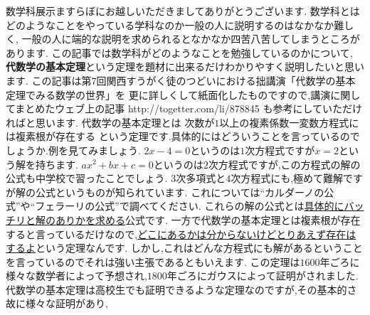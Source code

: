 


数学科展示ますらぼにお越しいただきましてありがとうございます.
数学科とはどのようなことをやっている学科なのか一般の人に説明するのはなかなか難しく,
一般の人に端的な説明を求められるとなかなか四苦八苦してしまうところがあります.
この記事では数学科がどのようなことを勉強しているのかについて,
\textbf{代数学の基本定理}という定理を題材に出来るだけわかりやすく説明したいと思います.
この記事は第7回関西すうがく徒のつどいにおける拙講演「代数学の基本定理でみる数学の世界」を
更に詳しくして紙面化したものですので,講演に関してまとめたウェブ上の記事 http://togetter.com/li/878845 も参考にしていただければと思います.
代数学の基本定理とは
\thm
次数が$1$以上の複素係数一変数方程式には複素根が存在する
\thmx
という定理です.具体的にはどういうことを言っているのでしょうか.例を見てみましょう.
\ex
$2x-4=0$というのは$1$次方程式ですが$x=2$という解を持ちます.
\exx
\ex
$ax^2+bx+c=0$というのは$2$次方程式ですが,この方程式の解の公式も中学校で習ったことでしょう.
\exx
\ex
$3$次多項式と$4$次方程式にも,極めて難解ですが解の公式というものが知られています.
これについては``カルダーノの公式''や``フェラーリの公式''で調べてください.
\exx
これらの解の公式とは\underline{具体的にバッチリと解のありかを求める}公式です.
一方で代数学の基本定理とは複素根が存在すると言っているだけなので,\underline{どこにあるかは分からないけどとりあえず存在はするよ}という定理なんです.
しかし,これはどんな方程式にも解があるということを言っているのでそれは強い主張であるともいえます.
この定理は$1600$年ごろに様々な数学者によって予想され,$1800$年ごろにガウスによって証明がされました.
代数学の基本定理は高校生でも証明できるような定理なのですが,その基本的さ故に様々な証明があり,
